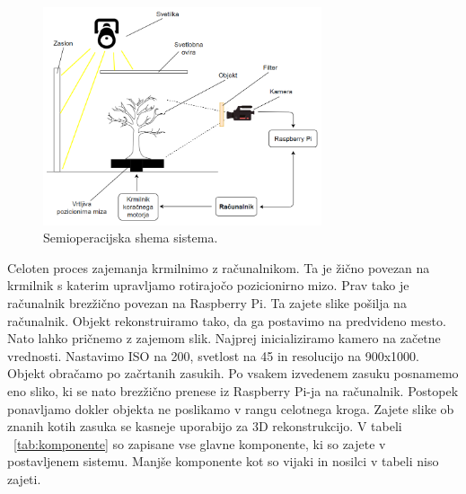 \documentclass[journal,a4paper,twoside]{sty/IEEEtran}
\begin{document}
\begin{figure}[H]
	\centerline{\includegraphics[width=8.2cm]{fig/blokovna_sistem}}
	\caption{Semioperacijska shema sistema.}
	\label{fig:blokovna}
\end{figure}
%
 Celoten proces zajemanja krmilnimo z računalnikom. Ta je žično povezan na krmilnik s katerim upravljamo rotirajočo pozicionirno mizo. Prav tako je računalnik brezžično povezan na Raspberry Pi. Ta zajete slike pošilja na računalnik. Objekt rekonstruiramo tako, da ga postavimo na predvideno mesto. Nato lahko pričnemo z zajemom slik. Najprej inicializiramo kamero na začetne vrednosti. Nastavimo ISO na 200, svetlost na 45 in resolucijo na 900x1000.  Objekt obračamo po začrtanih zasukih. Po vsakem izvedenem zasuku posnamemo eno sliko, ki se nato brezžično prenese iz Raspberry Pi-ja na računalnik. Postopek ponavljamo dokler objekta ne poslikamo v rangu celotnega kroga. Zajete slike ob znanih kotih zasuka se kasneje uporabijo za 3D rekonstrukcijo. V tabeli ~\ref{tab:komponente} so zapisane vse glavne komponente, ki so zajete v postavljenem sistemu. Manjše komponente kot so vijaki in nosilci v tabeli niso zajeti.
\end{document}
